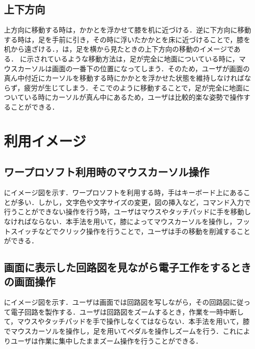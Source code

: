 \subsection{上下方向}
上方向に移動する時は，かかとを浮かせて膝を机に近づける．逆に下方向に移動する時は，足を手前に引き，その時に浮いたかかとを床に近づけることで，膝を机から遠ざける．，は，足を横から見たときの上下方向の移動のイメージである．
に示されているような移動方法は，足が完全に地面についている時に，マウスカーソルは画面の一番下の位置になってしまう．そのため，ユーザが画面の真ん中付近にカーソルを移動する時にかかとを浮かせた状態を維持しなければならず，疲労が生じてしまう．そこでのように移動することで，足が完全に地面についている時にカーソルが真ん中にあるため，ユーザは比較的楽な姿勢で操作することができる．

\section{利用イメージ}
\subsection{ワープロソフト利用時のマウスカーソル操作}
にイメージ図を示す．ワープロソフトを利用する時，手はキーボード上にあることが多い．しかし，文字色や文字サイズの変更，図の挿入など，コマンド入力で行うことができない操作を行う時，ユーザはマウスやタッチパッドに手を移動しなければならない．本手法を用いて，膝によってマウスカーソルを操作し，フットスイッチなどでクリック操作を行うことで，ユーザは手の移動を削減することができる．
\subsection{画面に表示した回路図を見ながら電子工作をするときの画面操作}
にイメージ図を示す．ユーザは画面では回路図を写しながら，その回路図に従って電子回路を製作する．ユーザは回路図をズームするとき，作業を一時中断して，マウスやタッチパッドを手で操作しなくてはならない．本手法を用いて，膝でマウスカーソルを操作し，足を用いてペダルを操作しズームを行う．これによりユーザは作業に集中したままズーム操作を行うことができる．





